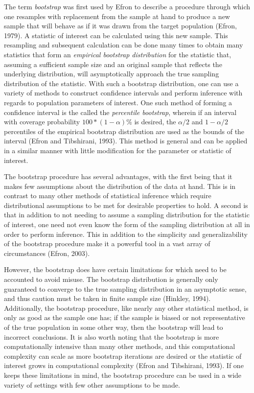 		The term \textit{bootstrap} was first used by Efron to describe a procedure through which one resamples with replacement from the sample at hand to produce a new sample that will behave as if it
		was drawn from the target population (Efron, 1979). A statistic of interest can be calculated using this new sample. This resampling and subsequent calculation can be done many times to obtain many statistics that form an
		\textit{empirical bootstrap distribution} for the statistic that, assuming a sufficient sample size and an original sample that reflects the underlying distribution, will asymptotically approach the
		true sampling distribution of the statistic. With such a bootstrap distribution, one can use a variety of methods to construct confidence intervals and perform inference with regards to population
		parameters of interest. One such method of forming a confidence interval is the called the \textit{percentile bootstrap}, wherein if an interval with coverage probability $100*(1-\alpha) \%$ is
		desired, the $\alpha/2$ and $1-\alpha/2$ percentiles of the empirical bootstrap distribution are used as the bounds of the interval (Efron and Tibshirani, 1993). This method is general and
		can be applied in a similar manner with little modification for the parameter or statistic of interest.

		The bootstrap procedure has several advantages, with the first being that it makes few assumptions about the distribution of the data at hand. This is in contrast to many other methods of
		statistical inference which require distributional assumptions to be met for desirable properties to hold. A second is that in addition to not needing to assume a sampling distribution for the statistic
		of interest, one need not even know the form of the sampling distribution at all in order to perform inference. This in addition to the simplicity and generalizability of the bootstrap procedure
		make it a powerful tool in a vast array of circumstances  (Efron, 2003).

		However, the bootstrap does have certain limitations for which need to be accounted to avoid misuse. The bootstrap distribution is generally only guaranteed to converge to the true sampling
		distribution in an asymptotic sense, and thus caution must be taken in finite sample size (Hinkley, 1994). Additionally, the bootstrap procedure, like nearly any other statistical method,
		is only as good as the sample one has; if the sample is biased or not representative of the true population in some other way, then the bootstrap will lead to incorrect conclusions. It is also
		worth noting that the bootstrap is more computationally intensive than many other methods, and this computational complexity can scale as more bootstrap iterations are desired or the statistic
		of interest grows in computational complexity (Efron and Tibshirani, 1993). If one keeps these limitations in mind, the bootstrap procedure can be used in a wide variety of settings with few
		other assumptions to be made.

